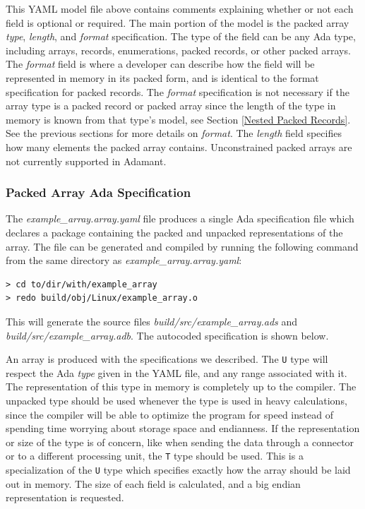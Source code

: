 
This YAML model file above contains comments explaining whether or not each field is optional or required. The main portion of the model is the packed array \textit{type}, \textit{length}, and \textit{format} specification. The type of the field can be any Ada type, including arrays, records, enumerations, packed records, or other packed arrays. The \textit{format} field is where a developer can describe how the field will be represented in memory in its packed form, and is identical to the format specification for packed records. The \textit{format} specification is not necessary if the array type is a packed record or packed array since the length of the type in memory is known from that type's model, see Section \ref{Nested Packed Records}. See the previous sections for more details on \textit{format}. The \textit{length} field specifies how many elements the packed array contains. Unconstrained packed arrays are not currently supported in Adamant.

\subsubsection{Packed Array Ada Specification}

The \textit{example\_array.array.yaml} file produces a single Ada specification file which declares a package containing the packed and unpacked representations of the array. The file can be generated and compiled by running the following command from the same directory as \textit{example\_array.array.yaml}:

\vspace{5mm} %
\begin{verbatim}
> cd to/dir/with/example_array
> redo build/obj/Linux/example_array.o
\end{verbatim}
\vspace{5mm} %

This will generate the source files \textit{build/src/example\_array.ads} and \textit{build/src/example\_array.adb}. The autocoded specification is shown below.


An array is produced with the specifications we described. The \texttt{U} type will respect the Ada \textit{type} given in the YAML file, and any range associated with it. The representation of this type in memory is completely up to the compiler. The unpacked type should be used whenever the type is used in heavy calculations, since the compiler will be able to optimize the program for speed instead of spending time worrying about storage space and endianness. If the representation or size of the type is of concern, like when sending the data through a connector or to a different processing unit, the \texttt{T} type should be used. This is a specialization of the \texttt{U} type which specifies exactly how the array should be laid out in memory. The size of each field is calculated, and a big endian representation is requested.

